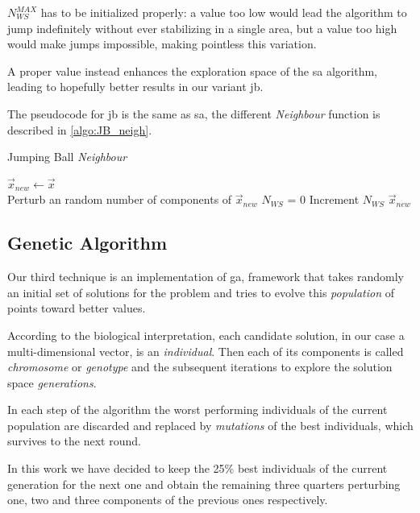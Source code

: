 \documentclass[journal]{IEEEtran}
\begin{document}
$N_{WS}^{MAX}$ has to be initialized properly: a value too low would lead the algorithm to jump indefinitely without ever stabilizing in a single area, but a value too high would make jumps impossible, making pointless this variation.

A proper value instead enhances the exploration space of the \gls{sa} algorithm, leading to hopefully better results in our variant \gls{jb}.

The pseudocode for \gls{jb} is the same as \gls{sa}, the different \emph{Neighbour} function is described in \autoref{algo:JB_neigh}.

\begin{algorithm}
	\caption{Jumping Ball \emph{Neighbour}}\label{algo:JB_neigh}
	 {
		$\vec{x}_{new} \gets \vec{x}$ \\
		 {
			 {
				Perturb an random number of components of $\vec{x}_{new}$
			}
			$N_{WS}$ = 0
		}
	}
	 {
		Increment $N_{WS}$
	}
	\Return $\vec{x}_{new}$
\end{algorithm}

\subsection{Genetic Algorithm}

Our third technique is an implementation of \gls{ga}, framework that takes randomly an initial set of solutions for the problem and tries to evolve this \emph{population} of points toward better values.

According to the biological interpretation, each candidate solution, in our case a multi-dimensional vector, is an \emph{individual}.
Then each of its components is called \emph{chromosome} or \emph{genotype} and the subsequent iterations to explore the solution space \emph{generations}.

In each step of the algorithm the worst performing individuals of the current population are discarded and replaced by \emph{mutations} of the best individuals, which survives to the next round.

In this work we have decided to keep the 25\% best individuals of the current generation for the next one and obtain the remaining three quarters perturbing one, two and three components of the previous ones respectively.
\end{document}
